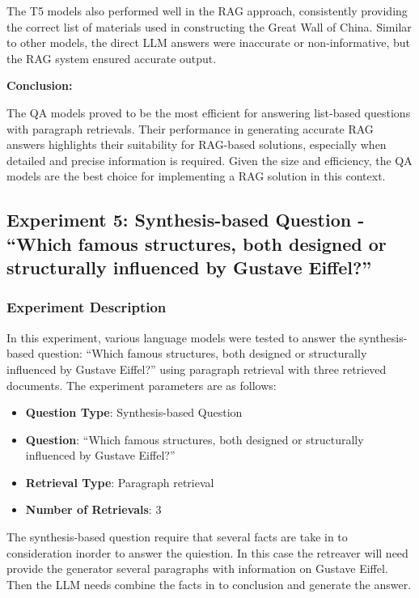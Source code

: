 \documentclass{wseas}
\begin{document}
The T5 models also performed well in the RAG approach, consistently
providing the correct list of materials used in constructing the Great
Wall of China. Similar to other models, the direct LLM answers were
inaccurate or non-informative, but the RAG system ensured accurate
output.

\textbf{Conclusion:}

The QA models proved to be the most efficient for answering list-based
questions with paragraph retrievals. Their performance in generating
accurate RAG answers highlights their suitability for RAG-based
solutions, especially when detailed and precise information is required.
Given the size and efficiency, the QA models are the best choice for
implementing a RAG solution in this context.


\subsection{Experiment 5: Synthesis-based Question - ``Which famous
structures, both designed or structurally influenced by Gustave
Eiffel?''}

\subsubsection{Experiment Description}

In this experiment, various language models were tested to answer the
synthesis-based question: ``Which famous structures, both designed or
structurally influenced by Gustave Eiffel?'' using paragraph retrieval
with three retrieved documents. The experiment parameters are as
follows:

\begin{itemize}
\item
  \textbf{Question Type}: Synthesis-based Question
\item
  \textbf{Question}: ``Which famous structures, both designed or
  structurally influenced by Gustave Eiffel?''
\item
  \textbf{Retrieval Type}: Paragraph retrieval
\item
  \textbf{Number of Retrievals}: 3
\end{itemize}

The synthesis-based question require that several facts are take in to
consideration inorder to answer the quiestion. In this case the
retreaver will need provide the generator several paragraphs with
information on Gustave Eiffel. Then the LLM needs combine the facts in
to conclusion and generate the answer.
\end{document}
